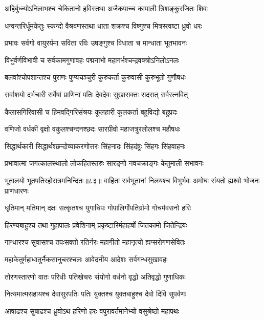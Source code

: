 \twolineshloka
{अहिर्बुध्न्योऽनिलाभश्च चेकितानो हविस्तथा}%
{अजैकपाच्च कापाली त्रिशङ्कुरजितः शिवः}%

\twolineshloka
{धन्वन्तरिर्धूमकेतुः स्कन्दो वैश्रवणस्तथा}%
{धाता शक्रश्च विष्णुश्च मित्रस्त्वष्टा ध्रुवो धरः}%

\twolineshloka
{प्रभावः सर्वगो वायुरर्यमा सविता रविः}%
{उषङ्गुश्च विधाता च मान्धाता भूतभावनः}%

\twolineshloka
{विभुर्वर्णविभावी च सर्वकामगुणावहः}%
{पद्मनाभो महागर्भश्चन्द्रवक्त्रोऽनिलोऽनलः}%

\twolineshloka
{बलवांश्चोपशान्तश्च पुराणः पुण्यचञ्चुरी}%
{कुरुकर्ता कुरुवासी कुरुभूतो गुणौषधः}%

\twolineshloka
{सर्वाशयो दर्भचारी सर्वेषां प्राणिनां पतिः}%
{देवदेवः सुखासक्तः सदसत् सर्वरत्नवित्}%

\twolineshloka
{कैलासगिरिवासी च हिमवद्गिरिसंश्रयः}%
{कूलहारी कूलकर्ता बहुविद्यो बहुप्रदः}%

\twolineshloka
{वणिजो वर्धकी वृक्षो वकुलश्चन्दनश्छदः}%
{सारग्रीवो महाजत्रुरलोलश्च महौषधः}%

\twolineshloka
{सिद्धार्थकारी सिद्धार्थश्छन्दोव्याकरणोत्तरः}%
{सिंहनादः सिंहदंष्ट्रः सिंहगः सिंहवाहनः}%

\twolineshloka
{प्रभावात्मा जगत्कालस्थालो लोकहितस्तरुः}%
{सारङ्गो नवचक्राङ्गः केतुमाली सभावनः}%

भूतालयो भूतपतिरहोरात्रमनिन्दितः॥८३॥
\twolineshloka
{वाहिता सर्वभूतानां निलयश्च विभुर्भवः}%
{अमोघः संयतो ह्यश्वो भोजनः प्राणधारणः}%

\twolineshloka
{धृतिमान् मतिमान् दक्षः सत्कृतश्च युगाधिपः}%
{गोपालिर्गोपतिर्ग्रामो गोचर्मवसनो हरिः}%

\twolineshloka
{हिरण्यबाहुश्च तथा गुहापालः प्रवेशिनाम्}%
{प्रकृष्टारिर्महाहर्षो जितकामो जितेन्द्रियः}%

\twolineshloka
{गान्धारश्च सुवासश्च तपःसक्तो रतिर्नरः}%
{महागीतो महानृत्यो ह्यप्सरोगणसेवितः}%

\twolineshloka
{महाकेतुर्महाधातुर्नैकसानुचरश्चलः}%
{आवेदनीय आदेशः सर्वगन्धसुखावहः}%

\twolineshloka
{तोरणस्तारणो वातः परिधीः पतिखेचरः}%
{संयोगो वर्धनो वृद्धो अतिवृद्धो गुणाधिकः}%

\twolineshloka
{नित्यमात्मसहायश्च देवासुरपतिः पतिः}%
{युक्तश्च युक्तबाहुश्च देवो दिवि सुपर्वणः}%

\twolineshloka
{आषाढश्च सुषाढश्च ध्रुवोऽथ हरिणो हरः}%
{वपुरावर्तमानेभ्यो वसुश्रेष्ठो महापथः}%

